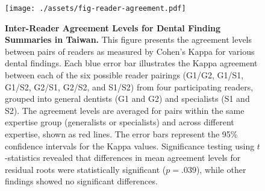 \begin{figure}[!t]
    \centering
    \texttt{[image: ./assets/fig-reader-agreement.pdf]}
    \caption{
        \textbf{Inter-Reader Agreement Levels for Dental Finding Summaries in Taiwan.}
        This figure presents the agreement levels between pairs of readers as measured by Cohen's Kappa for various dental findings.
        Each blue error bar illustrates the Kappa agreement between each of the six possible reader pairings (G1/G2, G1/S1, G1/S2, G2/S1, G2/S2, and S1/S2) from four participating readers, grouped into general dentists (G1 and G2) and specialists (S1 and S2).
        The agreement levels are averaged for pairs within the same expertise group (generalists or specialists) and across different expertise, shown as red lines.
        The error bars represent the 95\% confidence intervals for the Kappa values.
        Significance testing using $t$-statistics revealed that differences in mean agreement levels for residual roots were statistically significant ($p = .039$), while other findings showed no significant differences.
    }
    \label{fig:reader-agreement}
\end{figure}